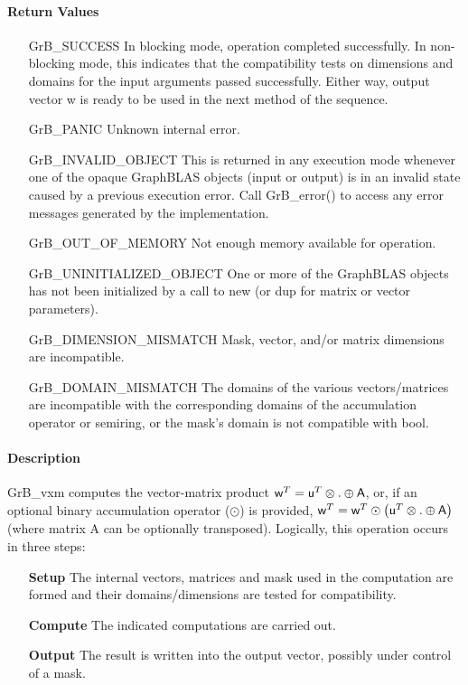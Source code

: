 \paragraph{Return Values}

\begin{itemize}[leftmargin=2.1in]
    \item[{\sf GrB\_SUCCESS}]         In blocking mode, operation
	completed successfully. In non-blocking mode, this indicates
	that the compatibility tests on dimensions and domains for the
	input arguments passed successfully. Either way, output vector
	{\sf w} is ready to be used in the next method of the sequence.

    \item[{\sf GrB\_PANIC}]           Unknown internal error.
    
    \item[{\sf GrB\_INVALID\_OBJECT}] This is returned in any execution mode 
    whenever one of the opaque GraphBLAS objects (input or output) is in an invalid 
    state caused by a previous execution error.  Call {GrB\_error()} to access 
    any error messages generated by the implementation.

    \item[{\sf GrB\_OUT\_OF\_MEMORY}]  Not enough memory available for operation.
    
    \item[{\sf GrB\_UNINITIALIZED\_OBJECT}] One or more of the GraphBLAS objects 
    has not been initialized by a call to {\sf new} (or {\sf dup} for matrix or
    vector parameters).

    \item[{\sf GrB\_DIMENSION\_MISMATCH}] Mask, vector, and/or matrix 
    dimensions are incompatible.

	\item[{\sf GrB\_DOMAIN\_MISMATCH}]    The domains of the various
	vectors/matrices are incompatible with the corresponding domains of the
	accumulation operator or semiring, or the mask's domain is not compatible with bool.
\end{itemize}

\paragraph{Description}

{\sf GrB\_vxm} computes the vector-matrix product ${\sf w}^T = {\sf
u}^T \otimes . \oplus {\sf A}$, or, if an optional binary accumulation
operator ($\odot$) is provided, ${\sf w}^T = {\sf w}^T \odot
\left({\sf u}^T \otimes . \oplus {\sf A}\right)$ (where matrix {\sf A}
 can be optionally transposed).  Logically, this operation
occurs in three steps:
\begin{enumerate}[leftmargin=0.75in]
\item[\bf Setup] The internal vectors, matrices and mask used in the computation are formed and their domains/dimensions are tested for compatibility.
\item[\bf Compute] The indicated computations are carried out.
\item[\bf Output] The result is written into the output vector, possibly under control of a mask.
\end{enumerate}

